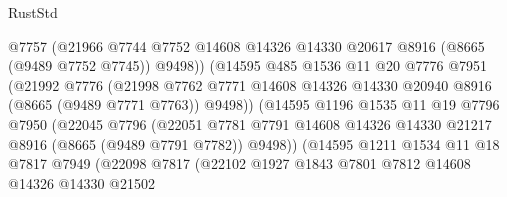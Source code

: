 \begin{lexlean}{RustStd}
\begin{coremodule}
                            @7757
                            (@21966
                              @7744
                              @7752
                              @14608
                              @14326
                              @14330
                              @20617
                              @8916
                              (@8665 (@9489 @7752 @7745))
                              @9498))
                          (@14595
                            @485
                            @1536
                            @11
                            @20
                            @7776
                            @7951
                            (@21992
                              @7776
                              (@21998
                                @7762
                                @7771
                                @14608
                                @14326
                                @14330
                                @20940
                                @8916
                                (@8665 (@9489 @7771 @7763))
                                @9498))
                            (@14595
                              @1196
                              @1535
                              @11
                              @19
                              @7796
                              @7950
                              (@22045
                                @7796
                                (@22051
                                  @7781
                                  @7791
                                  @14608
                                  @14326
                                  @14330
                                  @21217
                                  @8916
                                  (@8665 (@9489 @7791 @7782))
                                  @9498))
                              (@14595
                                @1211
                                @1534
                                @11
                                @18
                                @7817
                                @7949
                                (@22098
                                  @7817
                                  (@22102
                                    @1927
                                    @1843
                                    @7801
                                    @7812
                                    @14608
                                    @14326
                                    @14330
                                    @21502

\end{coremodule}
\end{lexlean}
